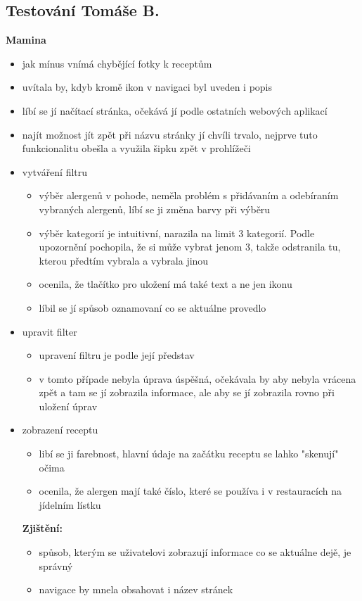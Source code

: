\documentclass[a4paper, 11pt]{article}
\begin{document}
\subsection{Testování Tomáše B.}
\noindent\textbf{Mamina} \\[-1em]
\begin{itemize}
    \item jak mínus vnímá chybějící fotky k receptům
    \item uvítala by, kdyb kromě ikon v navigaci byl uveden i popis
    \item líbí se jí načítací stránka, očekává jí podle ostatních webových aplikací
    \item najít možnost jít zpět při názvu stránky jí chvíli trvalo, nejprve tuto funkcionalitu obešla a využila šipku zpět v prohlížeči
    \item vytváření filtru
        \begin{itemize}
            \item výběr alergenů v pohode, neměla problém s přidávaním a odebíraním vybraných alergenů, líbí se ji změna barvy při výběru
            \item výběr kategorií je intuitivní, narazila na limit 3 kategorií. Podle upozornění pochopila, že si může vybrat jenom 3, takže odstranila tu, kterou předtím vybrala a vybrala jinou
            \item ocenila, že tlačítko pro uložení má také text a ne jen ikonu
            \item líbil se jí spůsob oznamovaní co se aktuálne provedlo
        \end{itemize}
    \item upravit filter
        \begin{itemize}
            \item upravení filtru je podle její představ
            \item v tomto případe nebyla úprava úspěšná, očekávala by aby nebyla vrácena zpět a tam se jí zobrazila informace, ale aby se jí zobrazila rovno při uložení úprav
        \end{itemize}
    \item zobrazení receptu
        \begin{itemize}
            \item libí se ji farebnost, hlavní údaje na začátku receptu se lahko "skenují" očima
            \item ocenila, že alergen mají také číslo, které se používa i v restauracích na jídelním lístku
        \end{itemize}

    \textbf{Zjištění:}
        \begin{itemize}
            \item spůsob, kterým se uživatelovi zobrazují informace co se aktuálne dejě, je správný
            \item navigace by mnela obsahovat i název stránek
    \end{itemize}
\end{itemize}
\end{document}
